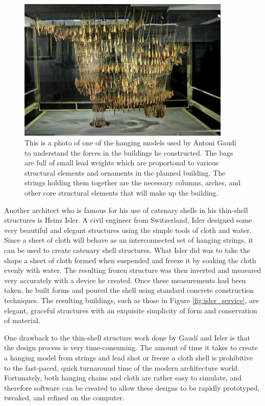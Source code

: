 \documentclass{thesis}
\begin{document}
\begin{figure}
\centering
\includegraphics[width=4in]{images/gaudi_model.jpg}
\caption[A hanging model used by Gaud\'{i}]{This is a photo of one of the hanging models used by Antoni Gaud\'{i} to understand the forces in
the buildings he constructed.  The bags are full of small lead weights which are proportonal to various structural elements and ornaments in
the planned building.  The strings holding them together are the necessary columns, arches, and other core structural elements that will make
up the building.\footnotemark}
\label{fig:gaudi_model}
\end{figure}

Another architect who is famous for his use of catenary shells in his thin-shell structures is Heinz Isler.  A civil engineer from Switzerland,
Isler designed some very beautiful and elegant structures using the simple tools of cloth and water.  Since a sheet of cloth will behave as an
interconnected set of hanging strings, it can be used to create catenary shell structures.  What Isler did was to take the shape a sheet of cloth
formed when suspended and freeze it by soaking the cloth evenly with water.  The resulting frozen structure was then inverted and measured very
accurately with a device he created.  Once these measurements had been taken, he built forms and poured the shell using standard concrete
construction techniques.  The resulting buildings, such as those in Figure \ref{fig:isler_service}, are elegant, graceful structures with an
exquisite simplicity of form and conservation of material.

One drawback to the thin-shell structure work done by Gaud\'{i} and Isler is that the design process is very time-consuming.  The amount of time
it takes to create a hanging model from strings and lead shot or freeze a cloth shell is prohibitive to the fast-paced, quick turnaround time of
the modern architecture world.  Fortunately, both hanging chains and cloth are rather easy to simulate, and therefore software can be created to
allow these designs to be rapidly prototyped, tweaked, and refined on the computer.
\end{document}
